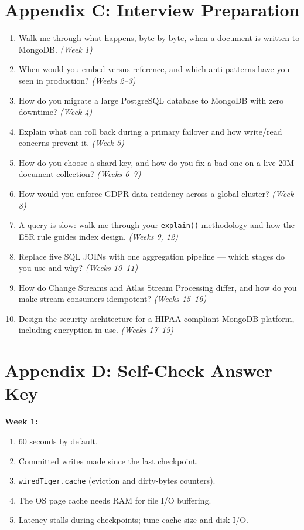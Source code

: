 \documentclass[11pt, a4paper]{article}
\begin{document}
\section{Appendix C: Interview Preparation}
\begin{enumerate}[itemsep=0pt]
    \item Walk me through what happens, byte by byte, when a document is written to MongoDB. \textit{(Week 1)}
    \item When would you embed versus reference, and which anti-patterns have you seen in production? \textit{(Weeks 2--3)}
    \item How do you migrate a large PostgreSQL database to MongoDB with zero downtime? \textit{(Week 4)}
    \item Explain what can roll back during a primary failover and how write/read concerns prevent it. \textit{(Week 5)}
    \item How do you choose a shard key, and how do you fix a bad one on a live 20M-document collection? \textit{(Weeks 6--7)}
    \item How would you enforce GDPR data residency across a global cluster? \textit{(Week 8)}
    \item A query is slow: walk me through your \texttt{explain()} methodology and how the ESR rule guides index design. \textit{(Weeks 9, 12)}
    \item Replace five SQL JOINs with one aggregation pipeline --- which stages do you use and why? \textit{(Weeks 10--11)}
    \item How do Change Streams and Atlas Stream Processing differ, and how do you make stream consumers idempotent? \textit{(Weeks 15--16)}
    \item Design the security architecture for a HIPAA-compliant MongoDB platform, including encryption in use. \textit{(Weeks 17--19)}
\end{enumerate}

\section{Appendix D: Self-Check Answer Key}

\textbf{Week 1:}
\begin{enumerate}[itemsep=0pt]
    \item 60 seconds by default.
    \item Committed writes made since the last checkpoint.
    \item \texttt{wiredTiger.cache} (eviction and dirty-bytes counters).
    \item The OS page cache needs RAM for file I/O buffering.
    \item Latency stalls during checkpoints; tune cache size and disk I/O.
\end{enumerate}
\end{document}
